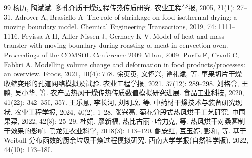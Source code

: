 \documentclass[withoutpreface,bwprint]{cumcmthesis} %
\begin{document}
\begin{thebibliography}{99}
    杨历, 陶斌斌.
    \newblock 多孔介质干燥过程传热传质研究\allowbreak[J].
    \newblock 农业工程学报, 2005, 21(1): 27--31.
    Adrover A, Brasiello A.
    \newblock The role of shrinkage on food isothermal drying: a moving boundary model\allowbreak[J].
    \newblock Chemical Engineering Transactions, 2019, 74: 1111--1116.
    Feyissa A H, Adler-Nissen J, Gernaey K V.
    \newblock Model of heat and mass transfer with moving boundary during roasting of meat in convection-oven\allowbreak[C].
    \newblock Proceedings of the COMSOL Conference 2009 Milan, 2009.
    Purlis E, Cevoli C, Fabbri A.
    \newblock Modelling volume change and deformation in food products/processes: an overview\allowbreak[J].
    \newblock Foods, 2021, 10(4): 778.
    徐英英, 文怀兴, 谭礼斌, 等.
    \newblock 苹果切片干燥收缩变形的孔道网络模拟及试验\allowbreak[J].
    \newblock 农业工程学报, 2021, 37(12): 289--298.
    刘格含, 王鹏, 吴小华, 等.
    \newblock 农产品热风干燥传热传质数值模拟研究进展\allowbreak[J].
    \newblock 食品工业科技, 2020, 41(22): 342--350, 357.
    王乐意, 李长河, 刘明政, 等.
    \newblock 中药材干燥技术与装备研究现状\allowbreak[J].
    \newblock 农业工程学报, 2024, 40(2): 1--28.
    张兴亮.
    \newblock 菊花分段式热风烘干工艺研究\allowbreak[J].
    \newblock 中国果菜, 2022, 42(8): 25--29.
    杜娟, 廖新福, 热比古丽·哈力克, 等.
    \newblock 热风烘干对桑葚制干效果的影响\allowbreak[J].
    \newblock 黑龙江农业科学, 2018(3): 113--120.
    鲍安红, 豆玉婷, 彭和, 等.
    \newblock 基于 Weibull 分布函数的厨余垃圾干燥过程模拟研究\allowbreak[J].
    \newblock 西南大学学报(自然科学版), 2022, 44(10): 173--180.
\end{thebibliography}
\end{document}
